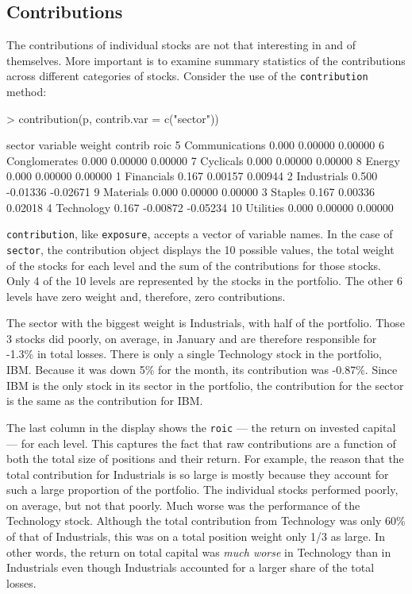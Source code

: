 \documentclass[a4paper]{report}
\begin{document}
\begin{article}
\subsection*{Contributions}

The contributions of individual stocks are not that interesting in and
of themselves. More important is to examine summary statistics of the
contributions across different categories of stocks. Consider the use
of the \texttt{contribution} method:

\begin{Schunk}
\begin{Sinput}
> contribution(p, contrib.var = c("sector"))
\end{Sinput}
\begin{Soutput}
sector 
         variable weight  contrib     roic
5  Communications  0.000  0.00000  0.00000
6   Conglomerates  0.000  0.00000  0.00000
7       Cyclicals  0.000  0.00000  0.00000
8          Energy  0.000  0.00000  0.00000
1      Financials  0.167  0.00157  0.00944
2     Industrials  0.500 -0.01336 -0.02671
9       Materials  0.000  0.00000  0.00000
3         Staples  0.167  0.00336  0.02018
4      Technology  0.167 -0.00872 -0.05234
10      Utilities  0.000  0.00000  0.00000
\end{Soutput}
\end{Schunk}

\texttt{contribution}, like \texttt{exposure}, accepts a vector of
variable names.  In the case of \texttt{sector}, the contribution
object displays the 10 possible values, the total weight of the stocks
for each level and the sum of the contributions for those stocks. Only
4 of the 10 levels are represented by the stocks in the portfolio. The
other 6 levels have zero weight and, therefore, zero contributions.

The sector with the biggest weight is Industrials, with half of the
portfolio. Those 3 stocks did poorly, on average, in January and are
therefore responsible for -1.3\% in total losses. There is only a
single Technology stock in the portfolio, IBM. Because it was down 5\%
for the month, its contribution was -0.87\%. Since IBM is the only
stock in its sector in the portfolio, the contribution for the sector
is the same as the contribution for IBM.

The last column in the display shows the \texttt{roic} --- the return
on invested capital --- for each level. This captures the fact that
raw contributions are a function of both the total size of positions
and their return. For example, the reason that the total contribution
for Industrials is so large is mostly because they account for such a
large proportion of the portfolio. The individual stocks performed
poorly, on average, but not that poorly. Much worse was the
performance of the Technology stock. Although the total contribution
from Technology was only 60\% of that of Industrials, this was on a
total position weight only 1/3 as large. In other words, the return on
total capital was \emph{much worse} in Technology than in Industrials
even though Industrials accounted for a larger share of the total
losses.


\end{article}
\end{document}
